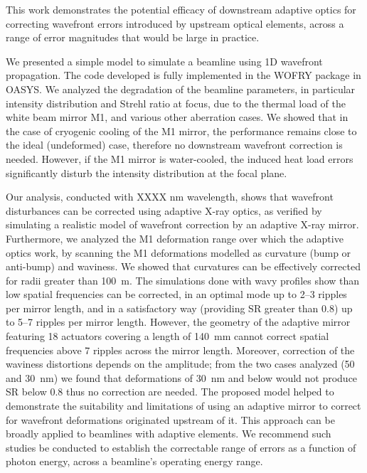 \documentclass[preprint]{iucr}
\begin{document}
This work demonstrates the potential efficacy of downstream adaptive optics for correcting wavefront errors introduced by upstream optical elements, across a range of error magnitudes that would be large in practice.

We presented a simple model to simulate a beamline using 1D wavefront propagation. The code developed is fully implemented in the WOFRY package in OASYS. We analyzed the degradation of the beamline parameters, in particular intensity distribution and Strehl ratio at focus, due to the thermal load of the white beam mirror M1, and various other aberration cases. We showed that in the case of cryogenic cooling of the M1 mirror, the performance remains close to the ideal (undeformed) case, therefore no downstream wavefront correction is needed. However, if the M1 mirror is water-cooled, the induced heat load errors significantly disturb the intensity distribution at the focal plane.

Our analysis, conducted with XXXX nm wavelength, shows that wavefront disturbances can be corrected using adaptive X-ray optics, as verified by simulating a realistic model of wavefront correction by an adaptive X-ray mirror. Furthermore, we analyzed the M1 deformation range over which the adaptive optics work, by scanning the M1 deformations modelled as curvature (bump or anti-bump) and waviness. We showed that curvatures can be effectively corrected for radii greater than 100~m. The simulations done with wavy profiles show than low spatial frequencies can be corrected, in an optimal mode up to 2--3 ripples per mirror length, and in a satisfactory way (providing SR greater than 0.8) up to 5--7 ripples per mirror length. However, the geometry of the adaptive mirror featuring 18 actuators covering a length of 140~mm cannot correct spatial frequencies above 7 ripples across the mirror length. Moreover, correction of the waviness distortions depends on the amplitude; from the two cases analyzed (50 and 30~nm) we found that deformations of 30~nm and below would not produce SR below 0.8 thus no correction are needed. The proposed model helped to demonstrate the suitability and limitations of using an adaptive mirror to correct for wavefront deformations originated upstream of it. This approach can be broadly applied to beamlines with adaptive elements. We recommend such studies be conducted to establish the correctable range of errors as a function of photon energy, across a beamline's operating energy range.

\end{document}
